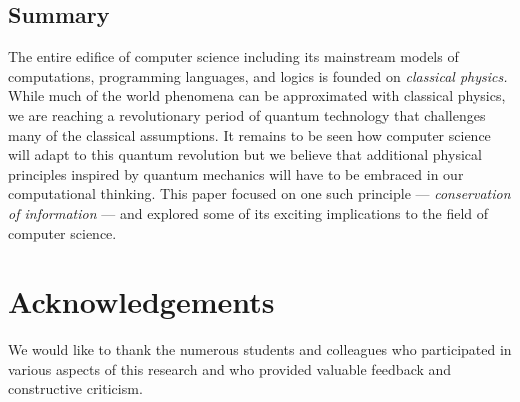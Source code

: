 \documentclass{article}
\begin{document}
\subsection{Summary} 

The entire edifice of computer science including its mainstream models
of computations, programming languages, and logics is founded on
\emph{classical physics.} While much of the world phenomena can be
approximated with classical physics, we are reaching a revolutionary
period of quantum technology that challenges many of the classical
assumptions. It remains to be seen how computer science will adapt to
this quantum revolution but we believe that additional physical
principles inspired by quantum mechanics will have to be embraced in
our computational thinking. This paper focused on one such principle
--- \emph{conservation of information} --- and explored some of its
exciting implications to the field of computer science. 

\section*{Acknowledgements} We would like to thank the numerous
students and colleagues who participated in various aspects of this
research and who provided valuable feedback and constructive criticism.



\end{document}
